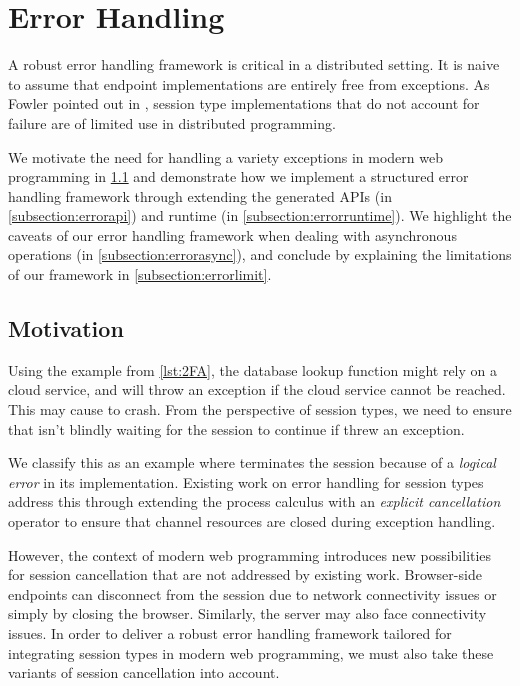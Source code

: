 \section{Error Handling}
\label{section:error}

A robust error handling framework is critical
in a distributed setting.
It is naive to assume that endpoint implementations
are entirely free from exceptions.
As Fowler pointed out in \cite{Exceptional},
session type implementations that do not account for failure
are of limited use in distributed programming.

We motivate the need for handling a variety exceptions in
modern web programming in \cref{subsection:errormotivation} and
demonstrate how we implement a structured error handling
framework through extending the generated APIs 
(in \cref{subsection:errorapi}) and 
runtime (in \cref{subsection:errorruntime}).
We highlight the caveats of our error handling framework
when dealing with asynchronous operations 
(in \cref{subsection:errorasync}),
and conclude by explaining the limitations of our framework
in \cref{subsection:errorlimit}.

\subsection{Motivation}
\label{subsection:errormotivation}

Using the  example from
\cref{lst:2FA}, the database lookup function
might rely on a cloud service, and will throw an exception
if the cloud service cannot be reached.
This may cause  to crash.
From the perspective of session types, we need to
ensure that  isn't blindly
waiting for the session to continue if 
threw an exception.

We classify this as an example where 
terminates the session because of a \textit{logical error}
in its implementation.
Existing work \cite{Exceptional,AffineSessions} 
on error handling for session types address this
through extending the process calculus with an
\textit{explicit cancellation} operator to ensure that
channel resources are closed during exception handling.

However, the context of modern web programming
introduces new possibilities for session cancellation
that are not addressed by existing work.
Browser-side endpoints can disconnect from the session due
to network connectivity issues or simply by closing
the browser. Similarly, the server may also face connectivity
issues. In order to deliver a robust error handling
framework tailored for integrating session types in 
modern web programming, we must also take these variants
of session cancellation into account.

